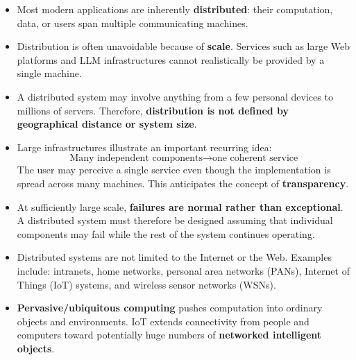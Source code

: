 \highspace
\begin{takeawaysbox}
    \begin{itemize}

        \item Most modern applications are inherently \textbf{distributed}: their
            computation, data, or users span multiple communicating machines.

        \item Distribution is often unavoidable because of \textbf{scale}.
            Services such as large Web platforms and LLM infrastructures cannot
            realistically be provided by a single machine.

        \item A distributed system may involve anything from a few personal
            devices to millions of servers. Therefore, \textbf{distribution is not
            defined by geographical distance or system size}.

        \item Large infrastructures illustrate an important recurring idea:
            \begin{equation*}
                \text{Many independent components}
                \longrightarrow
                \text{one coherent service}
            \end{equation*}
            The user may perceive a single service even though the implementation
            is spread across many machines. This anticipates the concept of
            \textbf{transparency}.

        \item At sufficiently large scale, \textbf{failures are normal rather
            than exceptional}. A distributed system must therefore be designed
            assuming that individual components may fail while the rest of the
            system continues operating.

        \item Distributed systems are not limited to the Internet or the Web.
            Examples include: intranets, home networks, personal area networks (PANs), Internet of Things (IoT) systems, and wireless sensor networks (WSNs).

        \item \textbf{Pervasive/ubiquitous computing} pushes computation into
            ordinary objects and environments. IoT extends connectivity from
            people and computers toward potentially huge numbers of
            \textbf{networked intelligent objects}.


\end{itemize}
\end{takeawaysbox}
